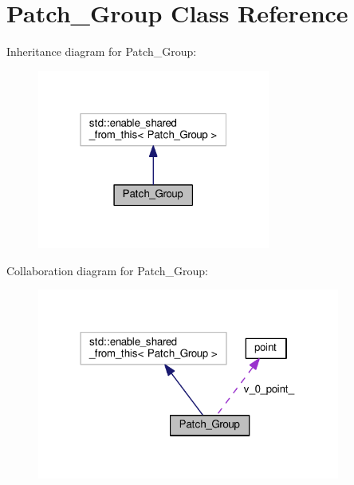 \hypertarget{classPatch__Group}{\section{Patch\+\_\+\+Group Class Reference}
\label{classPatch__Group}
}


Inheritance diagram for Patch\+\_\+\+Group\+:\nopagebreak
\begin{figure}[H]
\begin{center}
\leavevmode
\includegraphics[width=217pt]{classPatch__Group__inherit__graph}
\end{center}
\end{figure}


Collaboration diagram for Patch\+\_\+\+Group\+:\nopagebreak
\begin{figure}[H]
\begin{center}
\leavevmode
\includegraphics[width=282pt]{classPatch__Group__coll__graph}
\end{center}
\end{figure}
